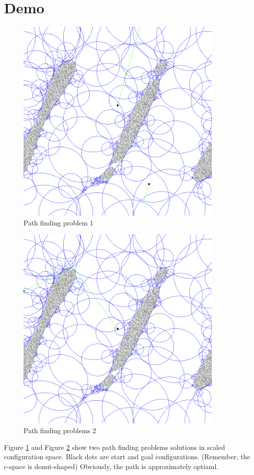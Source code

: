 \documentclass{article}
\begin{document}
\section{Demo}
    \begin{figure}
      \centering
      \includegraphics[width=4in]{Path1.PNG}
      \caption{Path finding problem 1}
      \label{fig:path1}
    \end{figure}
    \begin{figure}
      \centering
      \includegraphics[width=4in]{Path2.PNG}
      \caption{Path finding problems 2}
      \label{fig:path2}
    \end{figure}

    Figure \ref{fig:path1} and Figure \ref{fig:path2} show two path finding problems solutions in scaled configuration space. Black dots are start and goal configurations. (Remember, the c-space is donut-shaped) Obviously, the path is approximately optiaml.
\end{document}
